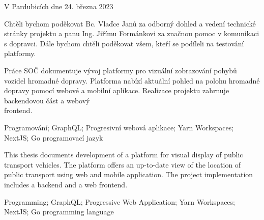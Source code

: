 \vspace{24 pt}

\noindent V Pardubicích dne 24. března 2023 \dotfill{}

\hspace{6.45cm} \authorName

\cleardoublepage

\vspace*{0.8\textheight}

\noindent
Chtěli bychom poděkovat Bc. Vlaďce Janů za odborný dohled a vedení technické stránky projektu a panu Ing. Jiřímu Formánkovi za značnou pomoc v komunikaci s dopravci. %
Dále bychom chtěli poděkovat všem, kteří se podíleli na testování platformy.

\cleardoublepage


\noindent Práce SOČ dokumentuje vývoj platformy pro vizuální zobrazování pohybů vozidel hromadné dopravy. Platforma nabízí aktuální pohled na polohu hromadné dopravy pomocí webové a mobilní aplikace. Realizace projektu zahrnuje backendovou část a webový \\ frontend.

\vspace{18pt}


\noindent Programování; GraphQL; Progresivní webová aplikace; Yarn Workspaces; NextJS; Go programovací jazyk
\vspace{18pt}


\noindent This thesis documents development of a platform for visual display of public transport vehicles. The platform offers an up-to-date view of the location of public transport using web and mobile application. The project implementation includes a backend and a web frontend.

\vspace{18pt}


\noindent Programming; GraphQL; Progressive Web Application; Yarn Workspaces; NextJS; Go programming language

\cleardoublepage